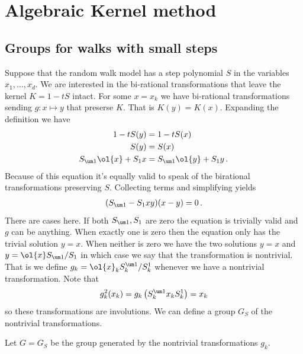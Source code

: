 
\chapter{Algebraic Kernel method}
\label{ch:AKM}


\section{Groups for walks with small steps}

Suppose that the random walk model has a step polynomial $S$ in the variables $x_1,\ldots, x_d$. We are interested in the bi-rational transformations that leave the kernel $K = 1 - tS$ intact. For some $x = x_k$ we have bi-rational transformations sending $g: x \mapsto y$ that preserse $K$. That is $K(y) = K(x)$. Expanding the definition we have
\begin{align}\begin{split}
		1- tS(y) &= 1- tS(x)\\
		S(y) &= S(x)\\
		S_{\um 1}\ol{x} + S_1 x & = S_{\um 1} \ol{y} + S_1 y\,.
\end{split}\end{align}
Because of this equation it's equally valid to speak of the birational transformations preserving $S$. Collecting terms and simplifying yields
\begin{align}
	(S_{\um 1}-S_1 xy)(x-y) = 0\,.
\end{align}
There are cases here. If both $S_{\um 1},S_1$ are zero the equation is trivially valid and $g$ can be anything. When exactly one is zero then the equation only has the trivial solution $y = x$. When neither is zero we have the two solutions $y= x$ and $y = \ol{x}S_{\um 1}/S_1$ in which case we say that the transformation is nontrivial. That is we define $g_k = \ol{x}_k S_k^{\um 1}/S_k^1$ whenever we have a nontrivial transformation. Note that
\begin{align}
	g_k^2(x_k) = g_k\left({S_k^{\um 1}}{x_kS_k^1}\right) = x_k
\end{align}
so these transformations are involutions. We can define a group $G_S$ of the nontrivial transformations.
\begin{definition} Let $G = G_S$ be the group generated by the nontrivial transformations $g_k$.
\end{definition}
